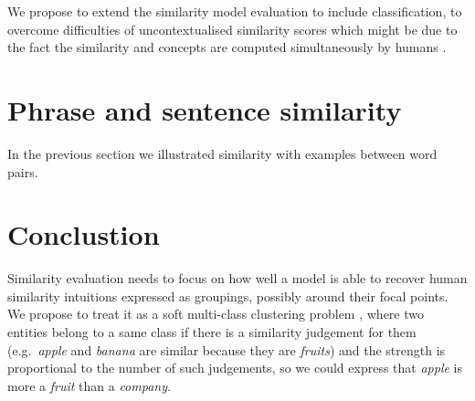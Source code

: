 \documentclass[11pt]{article}
\begin{document}
We propose to extend the similarity model evaluation to include classification, to overcome difficulties of uncontextualised similarity scores which might be due to the fact the similarity and concepts are computed simultaneously by humans \cite{hahn1997concepts}.

\section{Phrase and sentence similarity}

In the previous section we illustrated similarity with examples between word pairs. 

%
%


\section{Conclustion}

Similarity evaluation needs to focus on how well a model is able to recover human similarity intuitions expressed as groupings, possibly around their focal points. We propose to treat it as a soft multi-class clustering problem \cite{White:2015:WSE:2838931.2838932}, where two entities belong to a same class if there is a similarity judgement for them (e.g.~\textit{apple} and \textit{banana} are similar because they are \textit{fruits}) and the strength is proportional to the number of such judgements, so we could express that \textit{apple} is more a \textit{fruit} than a \textit{company}.




\balance
\end{document}
